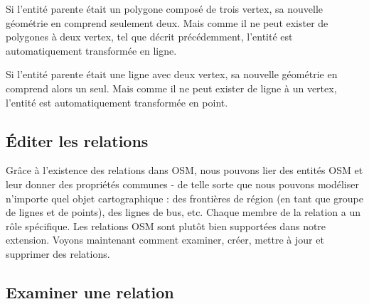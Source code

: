 Si l'entité parente était un polygone composé de trois vertex, sa nouvelle géométrie en comprend seulement deux. Mais comme il ne peut exister de polygones à deux vertex, tel que décrit précédemment, l'entité est automatiquement transformée en ligne.

Si l'entité parente était une ligne avec deux vertex, sa nouvelle géométrie en comprend alors un seul. Mais comme il ne peut exister de ligne à un vertex, l'entité est automatiquement transformée en point.

\subsection{Éditer les relations}\label{editing_osm_relation}

Grâce à l'existence des relations dans OSM, nous pouvons lier des entités OSM et leur donner des propriétés communes - de telle sorte que nous pouvons modéliser n'importe quel objet cartographique : des frontières de région (en tant que groupe de lignes et de points), des lignes de bus, etc. Chaque membre de la relation a un rôle spécifique. Les relations OSM sont plutôt bien supportées dans notre extension. Voyons maintenant comment examiner, créer, mettre à jour et supprimer des relations.

\subsection{Examiner une relation}\label{examrelation}

